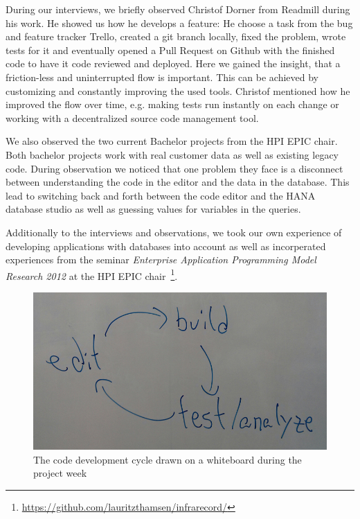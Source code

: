 
During our interviews, we briefly observed Christof Dorner from Readmill during his work. He showed us how he develops a feature: He choose a task from the bug and feature tracker Trello, created a git branch locally, fixed the problem, wrote tests for it and eventually opened a Pull Request on Github with the finished code to have it code reviewed and deployed. Here we gained the insight, that a friction-less and uninterrupted flow is important. This can be achieved by customizing and constantly improving the used tools. Christof mentioned how he improved the flow over time, e.g. making tests run instantly on each change or working with a decentralized source code management tool.

We also observed the two current Bachelor projects from the HPI EPIC chair. Both bachelor projects work with real customer data as well as existing legacy code. During observation we noticed that one problem they face is a disconnect between understanding the code in the editor and the data in the database. This lead to switching back and forth between the code editor and the HANA database studio as well as guessing values for variables in the queries.

Additionally to the interviews and observations, we took our own experience of developing applications with databases into account as well as incorperated experiences from the seminar \emph{Enterprise Application Programming Model Research 2012} at the HPI EPIC chair~\footnote{\url{https://github.com/lauritzthamsen/infrarecord/}}.

\begin{figure}
    \includegraphics[width=\linewidth]{images/EditBuildTest.jpg}
    \caption{The code development cycle drawn on a whiteboard during the project week}
    \label{fig:cycle}
\end{figure}

